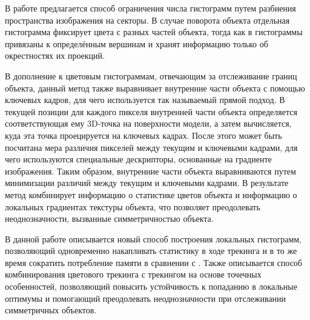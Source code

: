 В работе \cite{Zhong2018} предлагается способ ограничения числа гистограмм
путем разбиения пространства изображения на секторы.
В случае поворота объекта отдельная гистограмма фиксирует цвета с разных частей
объекта, тогда как в \cite{Tjaden2017} гистограммы привязаны к определённым
вершинам и хранят информацию только об окрестностях их проекций.

В дополнение к цветовым гистограммам, отвечающим за отслеживание границ
объекта, данный метод также выравнивает внутренние части объекта с помощью
ключевых кадров, для чего используется так называемый прямой подход.
В текущей позиции для каждого пикселя внутренней части объекта
определяется соответствующая ему 3D-точка на поверхности модели,
а затем вычисляется, куда эта точка проецируется на ключевых кадрах.
После этого может быть посчитана мера различия пикселей между текущим и
ключевыми кадрами, для чего используются специальные дескрипторы, основанные на
градиенте изображения.
Таким образом, внутренние части объекта выравниваются путем минимизации
различий между текущим и ключевыми кадрами.
В результате метод \cite{Zhong2018} комбинирует информацию о статистике цветов
объекта и информацию о локальных градиентах текстуры объекта, что позволяет
преодолевать неоднозначности, вызванные симметричностью объекта.

В данной работе описывается новый способ построения локальных гистограмм,
позволяющий одновременно накапливать статистику в ходе трекинга и в то же время
сократить потребление памяти в сравнении с \cite{Tjaden2017,Tjaden2018}.
Также описывается способ комбинирования цветового трекинга с трекингом на
основе точечных особенностей, позволяющий повысить устойчивость к попаданию в
локальные оптимумы и помогающий преодолевать неоднозначности при отслеживании
симметричных объектов.
